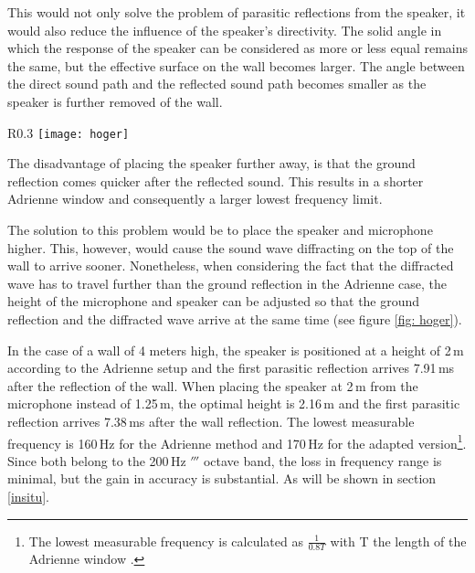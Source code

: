 This would not only solve the problem of parasitic reflections from the speaker, it would also reduce the influence of the speaker's directivity. The solid angle in which the response of the speaker can be considered as more or less equal remains the same, but the effective surface on the wall becomes larger. The angle between the direct sound path and the reflected sound path becomes smaller as the speaker is further removed of the wall.

\begin{wrapfigure}{R}{0.3\textwidth}
  \centering
    \texttt{[image: hoger]}
  \caption{Paths of the ground reflection and top diffraction.}
  \label{fig: hoger}
\end{wrapfigure}

The disadvantage of placing the speaker further away, is that the ground reflection comes quicker after the reflected sound. This results in a shorter Adrienne window and consequently a larger lowest frequency limit.

The solution to this problem would be to place the speaker and microphone higher. This, however, would cause the sound wave diffracting on the top of the wall to arrive sooner. Nonetheless, when considering the fact that the diffracted wave has to travel further than the ground reflection in the Adrienne case, the height of the microphone and speaker can be adjusted so that the ground reflection and the diffracted wave arrive at the same time (see figure \ref{fig: hoger}).

In the case of a wall of 4 meters high, the speaker is positioned at a height of 2\,m according to the Adrienne setup and the first parasitic reflection arrives 7.91\,ms after the reflection of the wall. When placing the speaker at 2\,m from the microphone instead of 1.25\,m, the optimal height is 2.16\,m and the first parasitic reflection arrives 7.38\,ms after the wall reflection. The lowest measurable frequency is 160\,Hz for the Adrienne method and 170\,Hz for the adapted version\footnote{The lowest measurable frequency is calculated as $\frac{1}{0.8 T}$ with T the length of the Adrienne window \cite[p.70]{Geetere}.}. Since both belong to the 200\,Hz $\third$ octave band, the loss in frequency range is minimal, but the gain in accuracy is substantial. As will be shown in section \ref{insitu}.




